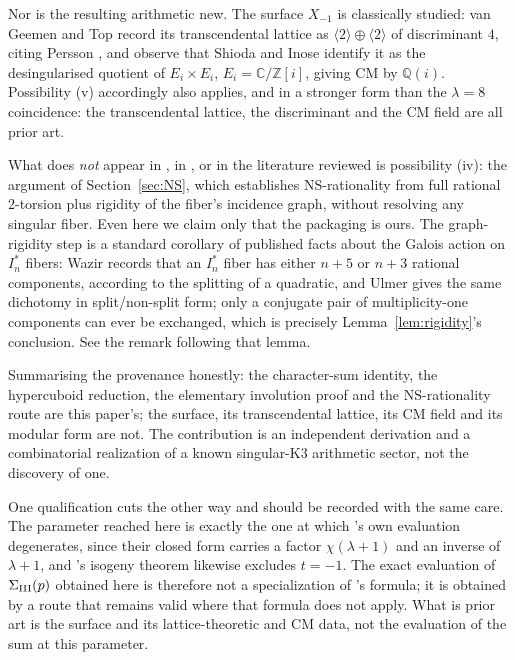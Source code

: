 \documentclass[11pt]{amsart}
\theoremstyle{definition}
\newcommand{\Q}{\mathbb{Q}}
\newcommand{\Z}{\mathbb{Z}}
\newcommand{\NS}{\mathrm{NS}}
\begin{document}
Nor is the resulting arithmetic new. The surface $X_{-1}$ is classically
studied: van Geemen and Top \cite{vanGeemenTop2006} record its
transcendental lattice as $\langle2\rangle\oplus\langle2\rangle$ of
discriminant $4$, citing Persson \cite{Persson1985}, and observe that
Shioda and Inose \cite{ShiodaInose1977} identify it as the desingularised
quotient of $E_i\times E_i$, $E_i=\mathbb{C}/\Z[i]$, giving CM by $\Q(i)$.
Possibility (v) accordingly also applies, and in a stronger form than the
$\lambda=8$ coincidence: the transcendental lattice, the discriminant and
the CM field are all prior art.

What does \emph{not} appear in \cite{AOP2002}, in
\cite{vanGeemenTop2006}, or in the literature reviewed is possibility
(iv): the argument of Section~\ref{sec:NS}, which establishes
$\NS$-rationality from full rational $2$-torsion plus rigidity of the
fiber's incidence graph, without resolving any singular fiber. Even here
we claim only that the packaging is ours. The graph-rigidity step is a
standard corollary of published facts about the Galois action on
$I_n^*$ fibers: Wazir \cite{Wazir2004} records that an $I_n^*$ fiber has
either $n+5$ or $n+3$ rational components, according to the splitting of a
quadratic, and Ulmer \cite{Ulmer2011} gives the same dichotomy in
split/non-split form; only a conjugate pair of multiplicity-one components
can ever be exchanged, which is precisely Lemma~\ref{lem:rigidity}'s
conclusion. See the remark following that lemma.

Summarising the provenance honestly: the character-sum identity, the
hypercuboid reduction, the elementary involution proof and the
$\NS$-rationality route are this paper's; the surface, its transcendental
lattice, its CM field and its modular form are not. The contribution is
an independent derivation and a combinatorial realization of a known
singular-K3 arithmetic sector, not the discovery of one.

One qualification cuts the other way and should be recorded with the
same care. The parameter reached here is exactly the one at which
\cite{AOP2002}'s own evaluation degenerates, since their closed form
carries a factor $\chi(\lambda+1)$ and an inverse of $\lambda+1$, and
\cite{vanGeemenTop2006}'s isogeny theorem likewise excludes $t=-1$. The
exact evaluation of $\Sigma_{\rm III}(p)$ obtained here is therefore not
a specialization of \cite{AOP2002}'s formula; it is obtained by a route
that remains valid where that formula does not apply. What is prior art
is the surface and its lattice-theoretic and CM data, not the evaluation
of the sum at this parameter.
\end{document}
